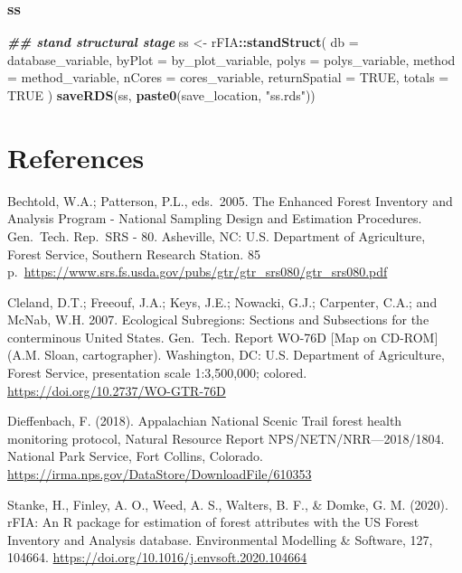 \documentclass[
]{book}
\newenvironment{Shaded}{\begin{snugshade}}{\end{snugshade}}
\newcommand{\AttributeTok}[1]{\textcolor[rgb]{0.13,0.29,0.53}{#1}}
\newcommand{\ConstantTok}[1]{\textcolor[rgb]{0.56,0.35,0.01}{#1}}
\newcommand{\DocumentationTok}[1]{\textcolor[rgb]{0.56,0.35,0.01}{\textbf{\textit{#1}}}}
\newcommand{\FunctionTok}[1]{\textcolor[rgb]{0.13,0.29,0.53}{\textbf{#1}}}
\newcommand{\NormalTok}[1]{#1}
\newcommand{\OtherTok}[1]{\textcolor[rgb]{0.56,0.35,0.01}{#1}}
\newcommand{\SpecialCharTok}[1]{\textcolor[rgb]{0.81,0.36,0.00}{\textbf{#1}}}
\newcommand{\StringTok}[1]{\textcolor[rgb]{0.31,0.60,0.02}{#1}}
\begin{document}
\hypertarget{ss}{%
\subsection{ss}\label{ss}}

\begin{Shaded}
\begin{Highlighting}[]
\DocumentationTok{\#\# stand structural stage}
\NormalTok{ss }\OtherTok{\textless{}{-}}\NormalTok{ rFIA}\SpecialCharTok{::}\FunctionTok{standStruct}\NormalTok{(}
  \AttributeTok{db =}\NormalTok{ database\_variable,}
  \AttributeTok{byPlot =}\NormalTok{ by\_plot\_variable,}
  \AttributeTok{polys =}\NormalTok{ polys\_variable,}
  \AttributeTok{method =}\NormalTok{ method\_variable,}
  \AttributeTok{nCores =}\NormalTok{ cores\_variable,}
  \AttributeTok{returnSpatial =} \ConstantTok{TRUE}\NormalTok{,}
  \AttributeTok{totals =} \ConstantTok{TRUE}
\NormalTok{)}
\FunctionTok{saveRDS}\NormalTok{(ss, }\FunctionTok{paste0}\NormalTok{(save\_location, }\StringTok{"ss.rds"}\NormalTok{))}
\end{Highlighting}
\end{Shaded}

\hypertarget{references}{%
\chapter{References}\label{references}}

Bechtold, W.A.; Patterson, P.L., eds.~2005. The Enhanced Forest Inventory and Analysis Program - National Sampling Design and Estimation Procedures. Gen.~Tech. Rep.~SRS - 80. Asheville, NC: U.S. Department of Agriculture, Forest Service, Southern Research Station. 85 p.~\url{https://www.srs.fs.usda.gov/pubs/gtr/gtr_srs080/gtr_srs080.pdf}

Cleland, D.T.; Freeouf, J.A.; Keys, J.E.; Nowacki, G.J.; Carpenter, C.A.; and McNab, W.H. 2007. Ecological Subregions: Sections and Subsections for the conterminous United States. Gen.~Tech. Report WO-76D {[}Map on CD-ROM{]} (A.M. Sloan, cartographer). Washington, DC: U.S. Department of Agriculture, Forest Service, presentation scale 1:3,500,000; colored. \url{https://doi.org/10.2737/WO-GTR-76D}

Dieffenbach, F. (2018). Appalachian National Scenic Trail forest health monitoring protocol, Natural Resource Report NPS/NETN/NRR---2018/1804. National Park Service, Fort Collins, Colorado. \url{https://irma.nps.gov/DataStore/DownloadFile/610353}

Stanke, H., Finley, A. O., Weed, A. S., Walters, B. F., \& Domke, G. M. (2020). rFIA: An R package for estimation of forest attributes with the US Forest Inventory and Analysis database. Environmental Modelling \& Software, 127, 104664. \url{https://doi.org/10.1016/j.envsoft.2020.104664}
\end{document}

